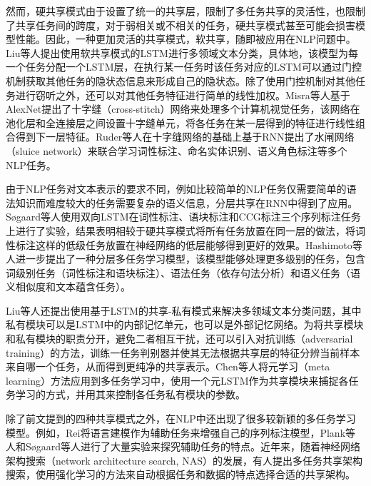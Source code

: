 然而，硬共享模式由于设置了统一的共享层，限制了多任务共享的灵活性，也限制了共享任务间的跨度，对于弱相关或不相关的任务，硬共享模式甚至可能会损害模型性能。因此，一种更加灵活的共享模式，软共享，随即被应用在NLP问题中。Liu等人\cite{DBLP:conf/ijcai/LiuQH16}提出使用软共享模式的LSTM进行多领域文本分类，具体地，该模型为每一个任务分配一个LSTM层，在执行某一任务时该任务对应的LSTM可以通过门控机制获取其他任务的隐状态信息来形成自己的隐状态。除了使用门控机制对其他任务进行窃听之外，还可以对其他任务特征进行简单的线性加权。Misra等人\cite{DBLP:conf/cvpr/MisraSGH16}基于AlexNet提出了十字缝（cross-stitch）网络来处理多个计算机视觉任务，该网络在池化层和全连接层之间设置十字缝单元，将各任务在某一层得到的特征进行线性组合得到下一层特征。Ruder等人\cite{1705.08142}在十字缝网络的基础上基于RNN提出了水闸网络（sluice network）来联合学习词性标注、命名实体识别、语义角色标注等多个NLP任务。

由于NLP任务对文本表示的要求不同，例如比较简单的NLP任务仅需要简单的语法知识而难度较大的任务需要复杂的语义信息，分层共享在RNN中得到了应用。S{\o}gaard等人\cite{DBLP:conf/acl/SogaardG16}使用双向LSTM在词性标注、语块标注和CCG标注三个序列标注任务上进行了实验，结果表明相较于硬共享模式将所有任务放置在同一层的做法，将词性标注这样的低级任务放置在神经网络的低层能够得到更好的效果。Hashimoto等人\cite{DBLP:conf/emnlp/HashimotoXTS17}进一步提出了一种分层多任务学习模型，该模型能够处理更多级别的任务，包含词级别任务（词性标注和语块标注）、语法任务（依存句法分析）和语义任务（语义相似度和文本蕴含任务）。

Liu等人还提出使用基于LSTM的共享-私有模式来解决多领域文本分类问题，其中私有模块可以是LSTM中的内部记忆单元\cite{DBLP:conf/ijcai/LiuQH16}，也可以是外部记忆网络\cite{DBLP:conf/emnlp/LiuQH16}。为将共享模块和私有模块的职责分开，避免二者相互干扰，还可以引入对抗训练（adversarial training）的方法，训练一任务判别器并使其无法根据共享层的特征分辨当前样本来自哪一个任务，从而得到更纯净的共享表示\cite{DBLP:conf/acl/LiuQH17}。Chen等人\cite{DBLP:journals/corr/abs-1802-08969}将元学习（meta learning）方法应用到多任务学习中，使用一个元LSTM作为共享模块来捕捉各任务学习的方式，并用其来控制各任务私有模块的参数。

除了前文提到的四种共享模式之外，在NLP中还出现了很多较新颖的多任务学习模型。例如，Rei\cite{DBLP:conf/acl/Rei17}将语言建模作为辅助任务来增强自己的序列标注模型，Plank等人\cite{DBLP:conf/eacl/PlankA17}和S{\o}gaard等人\cite{DBLP:conf/eacl/SogaardB17}进行了大量实验来探究辅助任务的特点。近年来，随着神经网络架构搜索（network architecture search, NAS）的发展，有人提出多任务共享架构搜索，使用强化学习的方法来自动根据任务和数据的特点选择合适的共享架构\cite{DBLP:journals/corr/abs-1808-07658}。

